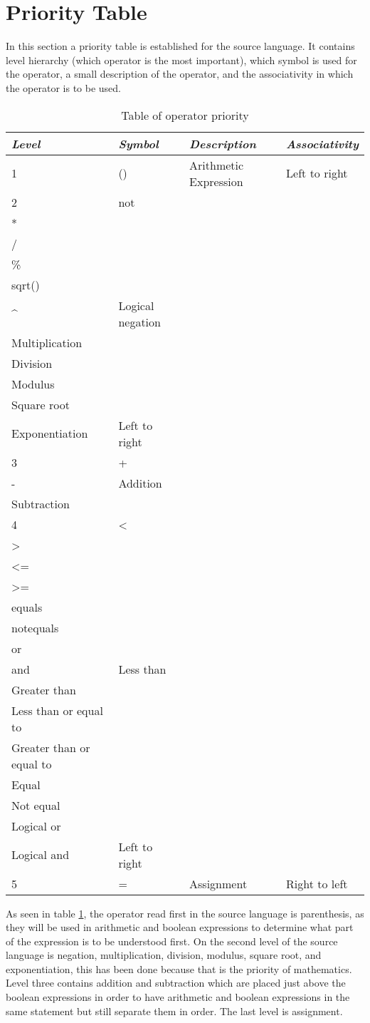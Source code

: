 \section{Priority Table}
In this section a priority table is established for the source language. It contains level hierarchy (which operator is the most important), which symbol is used for the operator, a small description of the operator, and the associativity in which the operator is to be used.
\begin{table}[H]
	\begin{tabular}{|l|l|l|l|}
	\hline
	\emph{Level} & \emph{Symbol} & \emph{Description} & \emph{Associativity} \\ 
 		\hline
 		1 & () & Arithmetic Expression & Left to right \\
 		\hline
 		2 & not \\ * \\ / \\ \% \\ sqrt() \\ ^ & Logical negation \\ Multiplication \\ Division \\ Modulus \\ Square root \\ Exponentiation & Left to right \\
 		\hline
 		3 & + \\ - & Addition \\ Subtraction & \todo{DUNNO?} \\
 		\hline
 		4 & < \\ > \\ <= \\ >= \\ equals \\ notequals \\ or \\ and & Less than \\ Greater than \\ Less than or equal to \\ Greater than or equal to \\ Equal \\ Not equal \\ Logical or \\ Logical and & Left to right \\
 		\hline
 		5 & = & Assignment & Right to left \\
	\end{tabular}
	\label{tab:priority}
	\caption{Table of operator priority}
\end{table}
As seen in table \ref{tab:priority}, the operator read first in the source language is parenthesis, as they will be used in arithmetic and boolean expressions to determine what part of the expression is to be understood first. On the second level of the source language is negation, multiplication, division, modulus, square root, and exponentiation, this has been done because that is the priority of mathematics. Level three contains addition and subtraction which are placed just above the boolean expressions in order to have arithmetic and boolean expressions in the same statement but still separate them in order. The last level is assignment. 